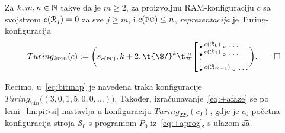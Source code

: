 \begin{definicija}
Za $k,m,n\in{\mathbb N}$ takve da je $m\ge 2$, za proizvoljnu RAM-konfiguraciju $c$ sa svojstvom $c(\mathcal R_{j})=0$ za sve $j\ge m$, i $c(\textsc{pc})\le n$, \emph{reprezentacija} je Turing-konfiguracija
\begin{equation}
Turing_{kmn}(c):=\biggl(s_{c(\textsc{pc})},k+2,\t{\$/}^k\t\#\!\left[\begin{array}{@{}l@{}}
\renewcommand{\arraystretch}{0.1}
\text\textbullet^{c(\reg0)}\text\textopenbullet\dotsm\\
\text\textbullet^{c(\reg1)}\text\textopenbullet\dotsm
\MTFlushSpaceBelow
\vdotswithin{\text\textbullet}
\MTFlushSpaceBelow
\text\textbullet^{c(\reg{m-1})}\text\textopenbullet\dotsm
\end{array}\right.\biggr)\text.\qedhere
\end{equation}
\end{definicija}

Recimo, u~\eqref{eq:bitmap} je navedena traka konfiguracije $Turing_{74n}\bigl((3,0,1,5,0,0,\dotsc)\bigr)$. Također, izračunavanje~\eqref{eq:+afaze} se po lemi~\ref{lm:pi>si} nastavlja u konfiguraciju $Turing_{225}(c_0)$, gdje je $c_0$ početna konfiguracija stroja $\mathcal S_0$ s programom $P_0$ iz~\eqref{eq:+aprog}, s ulazom \t{aa}.

